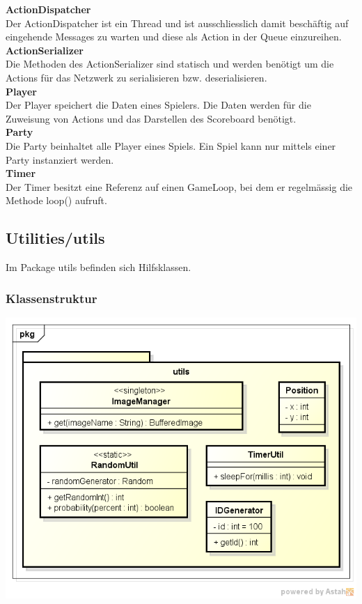 \documentclass[11pt]{scrartcl}
\begin{document}
\textbf{ActionDispatcher}\\
Der ActionDispatcher ist ein Thread und ist ausschliesslich damit beschäftig auf eingehende Messages zu warten und diese als Action in der Queue einzureihen.\\

\textbf{ActionSerializer}\\
Die Methoden des ActionSerializer sind statisch und werden benötigt um die
Actions für das Netzwerk zu serialisieren bzw. deserialisieren.\\

\textbf{Player}\\
Der Player speichert die Daten eines Spielers. Die Daten werden für die Zuweisung von Actions und das Darstellen des Scoreboard benötigt.\\

\textbf{Party}\\
Die Party beinhaltet alle Player eines Spiels. Ein Spiel kann nur mittels einer Party instanziert werden.\\

\textbf{Timer}\\
Der Timer besitzt eine Referenz auf einen GameLoop, bei dem er regelmässig die Methode loop() aufruft.

\newpage

\subsection{Utilities/utils}
Im Package utils befinden sich Hilfsklassen.
\subsubsection{Klassenstruktur}
\includegraphics[scale=0.75]{ClassDiagramUtils}
\end{document}
